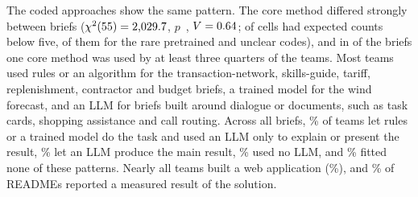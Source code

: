 \documentclass{article}
\begin{document}
The coded approaches show the same pattern. The core method differed strongly between briefs ($\chi^2(\num{55}) = \num{2029.7}$, $p$~\NRqThreeApproachByTrackP, $V = \num{0.64}$; \NRqThreeApproachByTrackCellsExpectedBelowFive{} of \NRqThreeApproachByTrackCells{} cells had expected counts below five, \NRqThreeApproachSmallCellsRare{} of them for the rare pretrained and unclear codes), and in \NRqThreeApproachBriefsTopSevenFive{} of the \NTracksCount{} briefs one core method was used by at least three quarters of the teams. Most teams used rules or an algorithm for the transaction-network, skills-guide, tariff, replenishment, contractor and budget briefs, a trained model for the wind forecast, and an LLM for briefs built around dialogue or documents, such as task cards, shopping assistance and call routing. Across all briefs, \NRqThreeApproachPatternExplainsPct\% of teams let rules or a trained model do the task and used an LLM only to explain or present the result, \NRqThreeApproachPatternLlmTaskPct\% let an LLM produce the main result, \NRqThreeApproachPatternNoLlmPct\% used no LLM, and \NRqThreeApproachPatternOtherPct\% fitted none of these patterns. Nearly all teams built a web application (\NRqThreeApproachWebAppPct\%), and \NRqThreeApproachEvaluationPct\% of READMEs reported a measured result of the solution.
\end{document}
